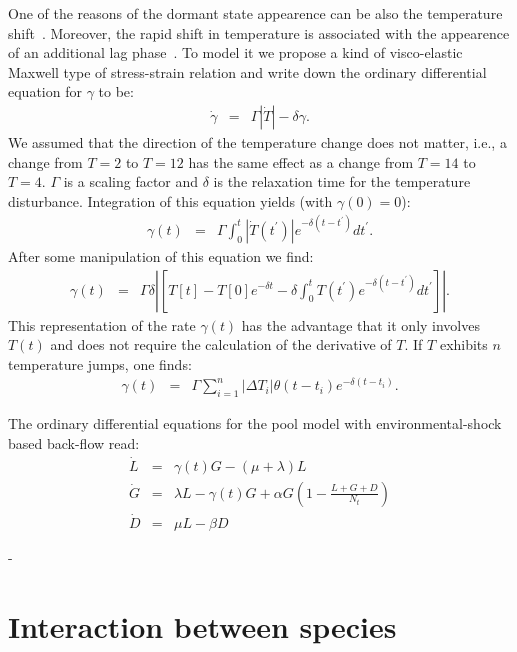 \documentclass[10pt,A4paper]{article}
\begin{document}
One of the reasons of the dormant state appearence can be also the temperature shift~\cite{oliver_viable_1995}.
Moreover, the rapid shift in temperature is associated with the appearence of an additional lag phase~\cite{zwietering_modeling_1994}.
To model it we propose a kind of visco-elastic Maxwell type of stress-strain relation and write down the ordinary differential equation for $\gamma$ to be:
\begin{eqnarray}
\dot{\gamma} &=& \Gamma \left |\dot{T}\right |-\delta \gamma.
\end{eqnarray}
We assumed that the direction of the temperature change does not matter, i.e., a change from $T=2$ to $T=12$ has the same effect as a change from $T=14$ to $T=4$. 
$\Gamma$ is a scaling factor and $\delta$ is the relaxation time for the temperature disturbance. 
Integration of this equation yields (with $\gamma(0)=0$):
\begin{eqnarray}
\gamma(t) &=& \Gamma \int_0^t \left |\dot{T}(t^{\prime})\right |e^{-\delta (t-t^{\prime})}dt^{\prime}.
\end{eqnarray}
After some manipulation of this equation we find:
\begin{eqnarray}
\gamma(t) &=& \Gamma\delta\left |\left[T[t]-T[0]e^{-\delta t}-\delta \int_0^t T(t^{\prime})e^{-\delta (t-t^{\prime})}dt^{\prime}\right]\right |.
\end{eqnarray}
This representation of the rate $\gamma(t)$ has the advantage that it only involves $T(t)$ and does not require the calculation of the derivative of $T$. 
If $T$ exhibits $n$ temperature jumps, one finds:
\begin{eqnarray}
\gamma(t) &=& \Gamma\sum_{i=1}^n \left |\Delta T_i \right |\theta(t-t_i)e^{-\delta(t-t_i)}.
\end{eqnarray}

The ordinary differential equations for the pool model with environmental-shock based back-flow read:
\begin{eqnarray}
\dot{L} &=&\gamma(t) G - (\mu + \lambda) L\\
\dot{G} &=& \lambda L -\gamma(t) G + \alpha G\left(1-\frac{L+G+D}{N_t}\right)\\
\dot{D} &=& \mu  L - \beta D
\end{eqnarray}

-  


\newpage

\section{Interaction between species}
\end{document}
